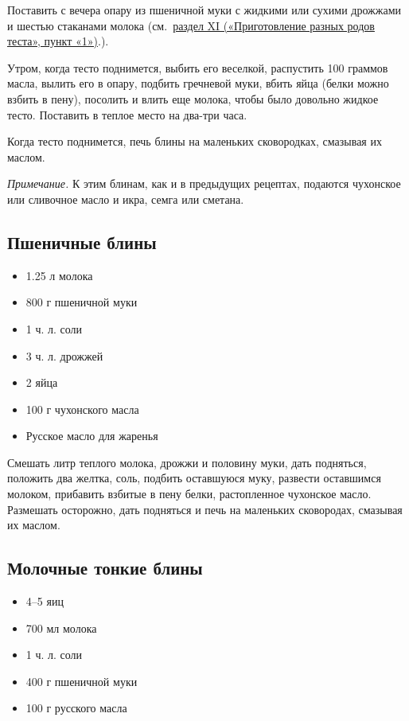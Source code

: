 Поставить с вечера опару из пшеничной муки с жидкими или сухими дрожжами и шестью стаканами молока (см.~\hyperref[sub:drozhzhevoje]{раздел XI («Приготовление разных родов теста», пункт «1»)}.).

Утром, когда тесто поднимется, выбить его веселкой, распустить 100 граммов масла, вылить его в опару, подбить гречневой муки, вбить яйца (белки можно взбить в пену), посолить и влить еще молока, чтобы было довольно жидкое тесто. Поставить в теплое место на два-три часа.

Когда тесто поднимется, печь блины на маленьких сковородках, смазывая их маслом.

\emph{Примечание.} К этим блинам, как и в предыдущих рецептах, подаются чухонское или сливочное масло и икра, семга или сметана.

\subsection{Пшеничные блины}

\begin{itemize}
	\item 1.25 л молока 
    \item 800 г пшеничной муки 
    \item 1 ч. л. соли 
    \item 3 ч. л. дрожжей
    \item 2 яйца
    \item 100 г чухонского масла
    \item Русское масло для жаренья
\end{itemize}

Смешать литр теплого молока, дрожжи и половину муки, дать подняться, положить два желтка, соль, подбить оставшуюся муку, развести оставшимся молоком, прибавить взбитые в пену белки, растопленное чухонское масло. Размешать осторожно, дать подняться и печь на маленьких сковородах, смазывая их маслом.

\subsection{Молочные тонкие блины}\label{sec:rec4(tonkije-bliny)}

\begin{itemize}
	\item 4–5 яиц
    \item 700 мл молока
    \item 1 ч. л. соли 
    \item 400 г пшеничной муки 
    \item 100 г русского масла
\end{itemize}

